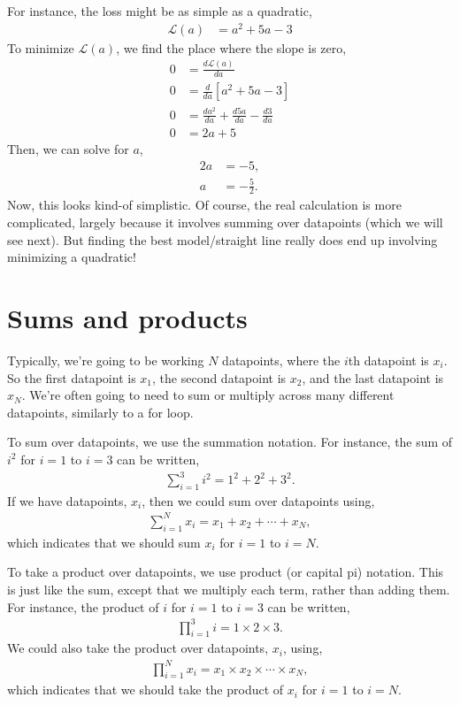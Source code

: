 \documentclass{article}
\newcommand{\dt}[2][]{\frac{d #1}{d #2}}
\renewcommand{\L}{\mathcal{L}}
\begin{document}
For instance, the loss might be as simple as a quadratic,
\begin{align}
  \L(a) &= a^2 + 5a - 3
\end{align}
To minimize $\L(a)$, we find the place where the slope is zero,
\begin{align}
  0 &= \dt[\L(a)]{a} \\
  0 &= \dt{a}[a^2 + 5a - 3]\\
  0 &= \dt[a^2]{a} + \dt[5a]{a} - \dt[3]{a}\\
  0 &= 2 a + 5
\end{align}
Then, we can solve for $a$,
\begin{align}
  2a &= -5,\\
  a &= -\tfrac{5}{2}.
\end{align}
Now, this looks kind-of simplistic.
Of course, the real calculation is more complicated, largely because it involves summing over datapoints (which we will see next).
But finding the best model/straight line really does end up involving minimizing a quadratic!

\section{Sums and products}
Typically, we're going to be working $N$ datapoints, where the $i$th datapoint is $x_i$.
So the first datapoint is $x_1$, the second datapoint is $x_2$, and the last datapoint is $x_N$.
We're often going to need to sum or multiply across many different datapoints, similarly to a for loop.

To sum over datapoints, we use the summation notation.  For instance, the sum of $i^2$ for $i=1$ to $i=3$ can be written,
\begin{align}
  \sum_{i=1}^3 i^2 = 1^2 + 2^2 + 3^2.
\end{align}
If we have datapoints, $x_i$, then we could sum over datapoints using,
\begin{align}
  \sum_{i=1}^N x_i = x_1 + x_2 + \dotsm + x_N,
\end{align}
which indicates that we should sum $x_i$ for $i=1$ to $i=N$.

To take a product over datapoints, we use product (or capital pi) notation.  This is just like the sum, except that we multiply each term, rather than adding them.
For instance, the product of $i$ for $i=1$ to $i=3$ can be written,
\begin{align}
  \prod_{i=1}^3 i = 1 \times 2 \times 3.
\end{align}
We could also take the product over datapoints, $x_i$, using,
\begin{align}
  \prod_{i=1}^N x_i = x_1 \times x_2 \times \dotsm \times x_N,
\end{align}
which indicates that we should take the product of $x_i$ for $i=1$ to $i=N$.
\end{document}
